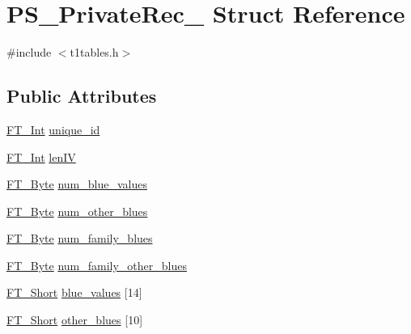 \hypertarget{struct_p_s___private_rec__}{}\section{P\+S\+\_\+\+Private\+Rec\+\_\+ Struct Reference}
\label{struct_p_s___private_rec__}


{\ttfamily \#include $<$t1tables.\+h$>$}

\subsection*{Public Attributes}
\begin{DoxyCompactItemize}
\item 
\mbox{\hyperlink{fttypes_8h_af90e5fb0d07e21be9fe6faa33f02484c}{F\+T\+\_\+\+Int}} \mbox{\hyperlink{struct_p_s___private_rec___ae862c1db170cfee85aa3242be9fa5d57}{unique\+\_\+id}}
\item 
\mbox{\hyperlink{fttypes_8h_af90e5fb0d07e21be9fe6faa33f02484c}{F\+T\+\_\+\+Int}} \mbox{\hyperlink{struct_p_s___private_rec___a796ebb92d96f0297ae584a911768db8b}{len\+IV}}
\item 
\mbox{\hyperlink{fttypes_8h_a51f26183ca0c9f4af958939648caeccd}{F\+T\+\_\+\+Byte}} \mbox{\hyperlink{struct_p_s___private_rec___ae3c56e75b5674451a7296cbb9f0a2e40}{num\+\_\+blue\+\_\+values}}
\item 
\mbox{\hyperlink{fttypes_8h_a51f26183ca0c9f4af958939648caeccd}{F\+T\+\_\+\+Byte}} \mbox{\hyperlink{struct_p_s___private_rec___a149acdf871b0739f7ab13b1ac8e48a28}{num\+\_\+other\+\_\+blues}}
\item 
\mbox{\hyperlink{fttypes_8h_a51f26183ca0c9f4af958939648caeccd}{F\+T\+\_\+\+Byte}} \mbox{\hyperlink{struct_p_s___private_rec___a1e8a432c78f00034c73cfc54c787b10f}{num\+\_\+family\+\_\+blues}}
\item 
\mbox{\hyperlink{fttypes_8h_a51f26183ca0c9f4af958939648caeccd}{F\+T\+\_\+\+Byte}} \mbox{\hyperlink{struct_p_s___private_rec___a7370e2e89f39f7ff8923f3d1befbcfce}{num\+\_\+family\+\_\+other\+\_\+blues}}
\item 
\mbox{\hyperlink{fttypes_8h_aa7279be89046a2563cd3d4d6651fbdcf}{F\+T\+\_\+\+Short}} \mbox{\hyperlink{struct_p_s___private_rec___ae2c23ed06e54b680473f924483685425}{blue\+\_\+values}} \mbox{[}14\mbox{]}
\item 
\mbox{\hyperlink{fttypes_8h_aa7279be89046a2563cd3d4d6651fbdcf}{F\+T\+\_\+\+Short}} \mbox{\hyperlink{struct_p_s___private_rec___a6da97f89e174d621936c75fe9b463e65}{other\+\_\+blues}} \mbox{[}10\mbox{]}

\end{DoxyCompactItemize}
